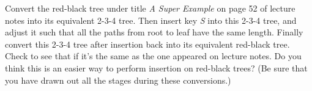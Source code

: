 Convert the red-black tree under title {\em A Super Example} on 
page 52 of lecture notes into its equivalent 2-3-4 tree. Then
insert key {\em S} into this 2-3-4 tree, and adjust it such that
all the paths from root to leaf have the same length. Finally convert
this 2-3-4 tree after insertion back into its equivalent red-black
tree. Check to see that if it's the same as the one appeared on
lecture notes. Do you think this is an easier way to perform
insertion on red-black trees? (Be sure that you have drawn out
all the stages during these conversions.)
